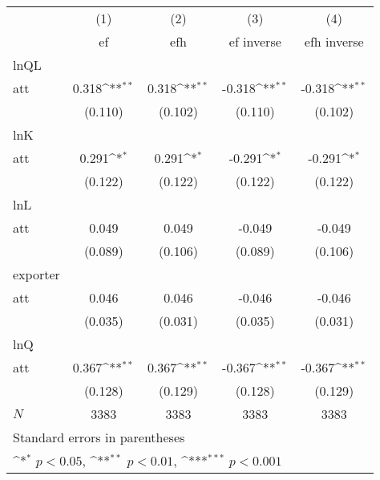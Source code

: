 {
\def\sym#1{\ifmmode^{#1}\else\(^{#1}\)\fi}
\begin{tabular}{l*{4}{c}}
\hline\hline
            &\multicolumn{1}{c}{(1)}&\multicolumn{1}{c}{(2)}&\multicolumn{1}{c}{(3)}&\multicolumn{1}{c}{(4)}\\
            &\multicolumn{1}{c}{ef}&\multicolumn{1}{c}{efh}&\multicolumn{1}{c}{ef inverse}&\multicolumn{1}{c}{efh inverse}\\
\hline
lnQL        &                     &                     &                     &                     \\
att         &       0.318\sym{**} &       0.318\sym{**} &      -0.318\sym{**} &      -0.318\sym{**} \\
            &     (0.110)         &     (0.102)         &     (0.110)         &     (0.102)         \\
\hline
lnK         &                     &                     &                     &                     \\
att         &       0.291\sym{*}  &       0.291\sym{*}  &      -0.291\sym{*}  &      -0.291\sym{*}  \\
            &     (0.122)         &     (0.122)         &     (0.122)         &     (0.122)         \\
\hline
lnL         &                     &                     &                     &                     \\
att         &       0.049         &       0.049         &      -0.049         &      -0.049         \\
            &     (0.089)         &     (0.106)         &     (0.089)         &     (0.106)         \\
\hline
exporter    &                     &                     &                     &                     \\
att         &       0.046         &       0.046         &      -0.046         &      -0.046         \\
            &     (0.035)         &     (0.031)         &     (0.035)         &     (0.031)         \\
\hline
lnQ         &                     &                     &                     &                     \\
att         &       0.367\sym{**} &       0.367\sym{**} &      -0.367\sym{**} &      -0.367\sym{**} \\
            &     (0.128)         &     (0.129)         &     (0.128)         &     (0.129)         \\
\hline
\(N\)       &        3383         &        3383         &        3383         &        3383         \\
\hline\hline
\multicolumn{5}{l}{\footnotesize Standard errors in parentheses}\\
\multicolumn{5}{l}{\footnotesize \sym{*} \(p<0.05\), \sym{**} \(p<0.01\), \sym{***} \(p<0.001\)}\\
\end{tabular}
}

